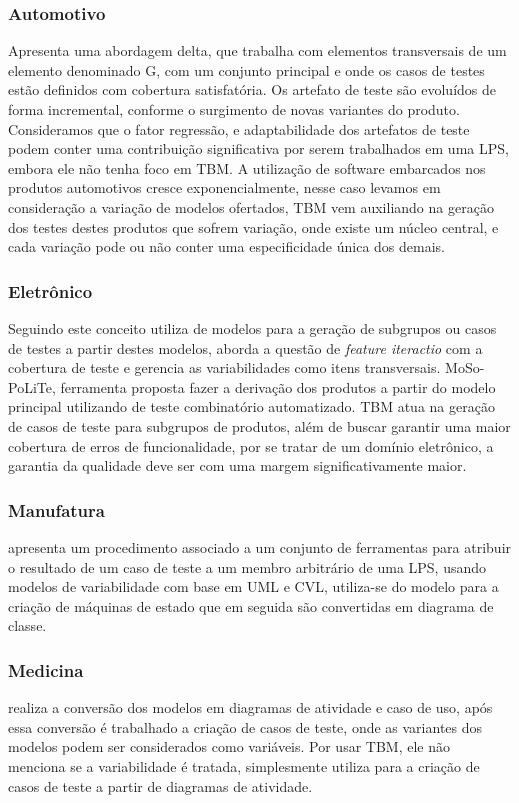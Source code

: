\subsubsection{Automotivo}
\cite{lity2012delta} Apresenta uma abordagem delta, que trabalha com elementos transversais de um elemento denominado G, com um conjunto principal e onde os casos de testes estão definidos com cobertura satisfatória. Os artefato de teste são evoluídos de forma incremental, conforme o surgimento de novas variantes do produto. Consideramos que o fator regressão, e adaptabilidade dos artefatos de teste podem conter uma contribuição significativa por serem trabalhados em uma LPS, embora ele não tenha foco em TBM. A utilização de software embarcados nos produtos automotivos cresce exponencialmente, nesse caso levamos em consideração a variação de modelos ofertados, TBM vem auxiliando na geração dos testes destes produtos que sofrem variação, onde existe um núcleo central, e cada variação pode ou não conter uma especificidade única dos demais.

\subsubsection{Eletrônico}
Seguindo este conceito \cite{steffens2012industrial} utiliza de modelos para a geração de subgrupos ou casos de testes a partir destes modelos, aborda a questão de \textit{feature iteractio} com a cobertura de teste e gerencia as variabilidades como itens transversais. MoSo-PoLiTe, ferramenta proposta fazer a derivação dos produtos a partir do modelo principal utilizando de teste combinatório automatizado. TBM atua na geração de casos de teste para subgrupos de produtos, além de buscar garantir uma maior cobertura de erros de funcionalidade, por se tratar de um domínio eletrônico, a garantia da qualidade deve ser com uma margem significativamente maior.

\subsubsection{Manufatura}

\cite{knapp2014use} apresenta um procedimento associado a um conjunto de ferramentas para atribuir o resultado de um caso de teste a um membro arbitrário de uma LPS, usando modelos de variabilidade com base em UML e CVL, utiliza-se do modelo para a criação de máquinas de estado que em seguida são convertidas em diagrama de classe.

\subsubsection{Medicina}
\cite{hasling2008model} realiza a conversão dos modelos em diagramas de atividade e caso de uso, após essa conversão é trabalhado a criação de casos de teste, onde as variantes dos modelos podem ser considerados como variáveis. Por usar TBM, ele não menciona se a variabilidade é tratada, simplesmente utiliza para a criação de casos de teste a partir de diagramas de atividade.

